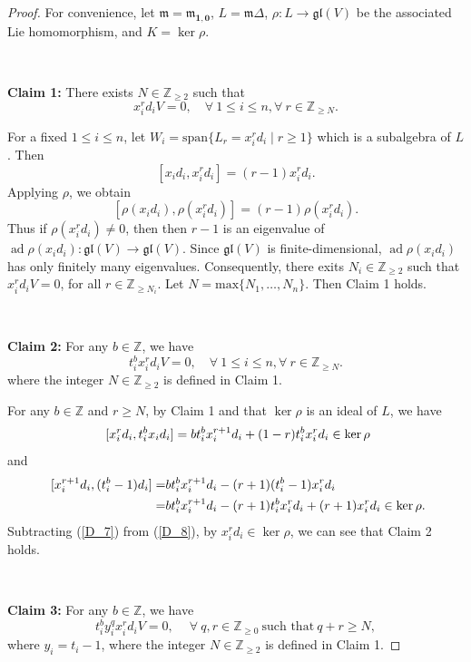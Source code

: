 \documentclass[12pt,a4paper]{amsart}
\numberwithin{equation}{section}
\newcommand{\Z}{\mathbb{Z}}
\def\mm{\mathfrak{m}}
\def\b1{\mathbf{1}}
\def\bo{\mathbf{0}}
\begin{document}
\begin{proof}
For convenience,
let $\mm=\mm_{\b1,\bo}$, $L=\mathfrak m\Delta$,  $\rho: L\rightarrow\mathfrak{gl}(V)$ be the associated Lie homomorphism, and
$K=\ker\rho$.

\

\noindent \textbf{Claim 1:}
There exists \(N\in \Z_{\geq2}\) such that
\begin{equation}\label{eq1} x_i^{r}d_i V=0,\quad \forall\ 1\leq i\leq n, \forall\ r\in \Z_{\geq N}. \end{equation}

 For a fixed $1\leq i\leq n$, let $W_i=\text{span}\{L_r=x_i^rd_i\mid r\geq1\}$ which is a subalgebra of $L$. Then
 $$[x_id_i,x_i^{r}d_i]=(r-1)x_i^{r}d_i.$$
 Applying $\rho$, we obtain
 $$[\rho(x_id_i),\rho(x_i^{r}d_i)]=(r-1)\rho(x_i^{r}d_i).$$
 Thus if $\rho(x_i^{r}d_i)\neq 0$, then
 then \(r-1\) is an eigenvalue of $ \operatorname{ad}\rho(x_id_i) \colon \mathfrak{gl}(V)\longrightarrow\mathfrak{gl}(V)$. Since \(\mathfrak{gl}(V)\) is finite-dimensional, \(\operatorname{ad}\rho(x_id_i)\) has only finitely many eigenvalues. Consequently, there exits $N_i\in \Z_{\geq 2}$ such
 that  $x_i^{r}d_i V=0$, for all $r\in \Z_{\geq N_i}$. Let $N=\text{max}\{N_1,\dots,N_n\}$. Then Claim 1 holds.

\

\noindent \textbf{Claim 2:}
For any $b\in \Z$, we have
\begin{equation}\label{eq1} t_i^{b}x_i^{r}d_i V=0,\quad \forall\ 1\leq i\leq n,   \forall\ r\in \Z_{\geq N}. \end{equation}
where the integer \(N\in \Z_{\geq2 }\) is defined in Claim 1.

 For any $b\in \Z$ and $r\geq N$, by Claim 1 and that $\ker\rho$ is an ideal of $L$, we have
\begin{equation}\label{D_7}
\aligned \
[x_i^{r}d_i,t_i^bx_id_i]=bt_i^bx_i^{r+1}d_i+(1-r)t_i^bx_i^rd_i\in \ker\rho
\endaligned
\end{equation}
and
\begin{equation}\label{D_8}
\aligned \
[x_i^{r+1}d_i,(t_i^b-1)d_i]=&bt_i^bx_i^{r+1}d_i-(r+1)(t_i^b-1)x_i^rd_i\\
=&bt_i^bx_i^{r+1}d_i-(r+1)t_i^bx_i^rd_i+(r+1)x_i^rd_i\in \ker\rho.
\endaligned
\end{equation}
 Subtracting (\ref{D_7}) from (\ref{D_8}), by $x_i^rd_i\in \ker\rho$, we can see that Claim 2 holds.

\

\noindent \textbf{Claim 3:} For any $b\in \Z$, we have
\begin{equation}\label{eq1} t_i^{b}y_i^qx_i^{r}d_i V=0,\quad \  \forall\ q, r\in \Z_{\geq 0}\
\text{such that}\ q+r\geq N, \end{equation}
where $y_i=t_i-1$, where the integer \(N\in \Z_{\geq2 }\) is defined in Claim 1.


\end{proof}
\end{document}
